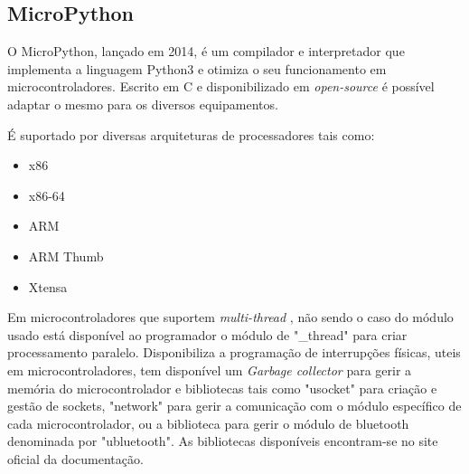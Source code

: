 \subsection {MicroPython}
\par O MicroPython\cite{MicroPython}, lançado em 2014, é um compilador e interpretador que implementa a linguagem Python3 e otimiza o seu funcionamento em microcontroladores. Escrito em C e disponibilizado em \textit{open-source} é possível adaptar o mesmo para os diversos equipamentos. \par
É suportado por diversas arquiteturas de processadores tais como:
\par
\begin{itemize}
\item x86
\item x86-64
\item ARM
\item ARM Thumb
\item Xtensa
\end{itemize}
\par
Em microcontroladores que suportem \textit{multi-thread} , não sendo o caso do módulo usado está disponível ao programador o módulo de "\_thread" para criar processamento paralelo. Disponibiliza a programação de interrupções físicas, uteis em microcontroladores, tem disponível um \textit{Garbage collector} para gerir a memória do microcontrolador e bibliotecas tais como "usocket" para criação e gestão de sockets, "network" para gerir a comunicação com o módulo específico de cada microcontrolador, ou a biblioteca para gerir o módulo de bluetooth denominada por "ubluetooth". As bibliotecas disponíveis encontram-se no site oficial da documentação\cite{micropython_lib}. 


